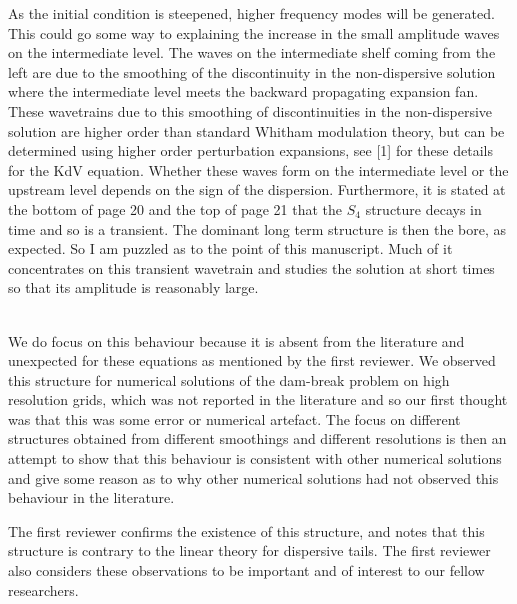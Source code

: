 \documentclass[times]{article}
\begin{document}
	As the initial condition is steepened, higher frequency	modes will be generated. This could go some way to explaining the increase in the small amplitude waves on the intermediate level.	The waves on the intermediate shelf coming from the left are due to the smoothing of the	discontinuity in the non-dispersive solution where the intermediate level meets the backward	propagating expansion fan. These wavetrains due to this smoothing of discontinuities in the	non-dispersive solution are higher order than standard Whitham modulation theory, but can be determined using higher order perturbation expansions, see [1] for these details for the KdV
	equation. Whether these waves form on the intermediate level or the upstream level depends	on the sign of the dispersion. Furthermore, it is stated at the bottom of page 20 and the top	of page 21 that the $S_4$ structure decays in time and so is a transient. The dominant long term structure is then the bore, as expected. So I am puzzled as to the point of this manuscript.	Much of it concentrates on this transient wavetrain and studies the solution at short times
	so that its amplitude is reasonably large. \\ \\
	
	{\color{blue} We do focus on this behaviour because it is absent from the literature and unexpected for these equations as mentioned by the first reviewer. We observed this structure for numerical solutions of the dam-break problem on high resolution grids, which was not reported in the literature and so our first thought was that this was some error or numerical artefact. The focus on different structures obtained from different smoothings and different resolutions is then an attempt to show that this behaviour is consistent with other numerical solutions and give some reason as to why other numerical solutions had not observed this behaviour in the literature.
	
	The first reviewer confirms the existence of this structure, and notes that this structure is contrary to the linear theory for dispersive tails. The first reviewer also considers these observations to be important and of interest to our fellow researchers.
	} \\ \\
	
\end{document}
